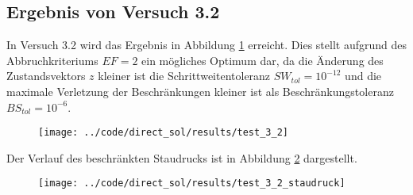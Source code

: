 \subsection{Ergebnis von Versuch 3.2}\label{kap:Versuch32}
In Versuch 3.2 wird das Ergebnis in Abbildung \ref{img:test_3_2} erreicht. Dies stellt aufgrund des Abbruchkriteriums $EF = 2$ ein mögliches Optimum dar, da die Änderung des Zustandsvektors $z$ kleiner ist die Schrittweitentoleranz $SW_{tol} = 10^{-12}$ und die maximale Verletzung der Beschränkungen kleiner ist als Beschränkungstoleranz $BS_{tol} = 10^{-6}$.
\begin{figure}[H]
\begin{center}
\texttt{[image: ../code/direct\_sol/results/test\_3\_2]}
 \label{img:test_3_2}
\end{center}
\end{figure}
Der Verlauf des beschränkten Staudrucks ist in Abbildung \ref{img:test_3_2_staudruck} dargestellt.
\begin{figure}[H]
\begin{center}
\texttt{[image: ../code/direct\_sol/results/test\_3\_2\_staudruck]}
 \label{img:test_3_2_staudruck}
\end{center}
\end{figure}












\newpage
